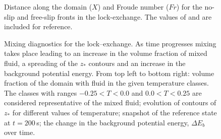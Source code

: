 \begin{figure}[!h]
  \centering
  \caption{Distance along the domain ($X$) and Froude number ($Fr$) for the no-slip and free-slip fronts in the lock-exchange. The values of \citet{hartel_00} and \citet{simpson_79} are included for reference.}
  \label{fig:lock_exchange_Fr}
\end{figure}

\begin{figure}[!h]
  \centering
  \caption[Mixing diagnostics for the lock--exchange.]{Mixing diagnostics for the lock--exchange. As time progresses mixing takes place leading to an increase in the volume fraction of mixed fluid, a spreading of the $z_*$ contours and an increase in the background potential energy. From top left to bottom right: volume fraction of the domain with fluid in the given temperature classes. The classes with ranges $-0.25<T<0.0$ and $0.0<T<0.25$ are considered representative of the mixed fluid; evolution of contours of $z_*$ for different values of temperature; snapshot of the reference state at $t = 200\,$s; the change in the background potential energy, $\Delta E_b$ over time.}
  \label{fig:lock_exchange_mixing}
\end{figure}

